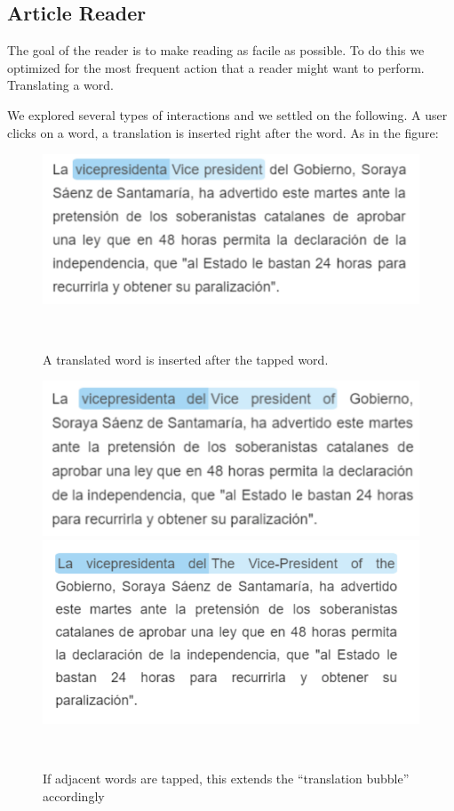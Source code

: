 \subsection{Article Reader}

The goal of the reader is to make reading as facile as possible. To do this we optimized for the most frequent action that a reader might want to perform. Translating a word. 

We explored several types of interactions and we settled on the following. 
A user clicks on a word, a translation is inserted right after the word. As in the figure: 

\begin{figure}[h!]
\centering
  \includegraphics[width=0.8\columnwidth]{figures/translated_word}
  \caption{A translated word is inserted after the tapped word.}~\label{fig:registrations}
\end{figure}

\begin{figure}[h!]
\centering
  \includegraphics[width=0.8\columnwidth]{figures/translated_words1}
  \includegraphics[width=0.8\columnwidth]{figures/translated_words2}
  \caption{If adjacent words are tapped, this extends the ``translation bubble'' accordingly}~\label{fig:translation_extension}
\end{figure}

